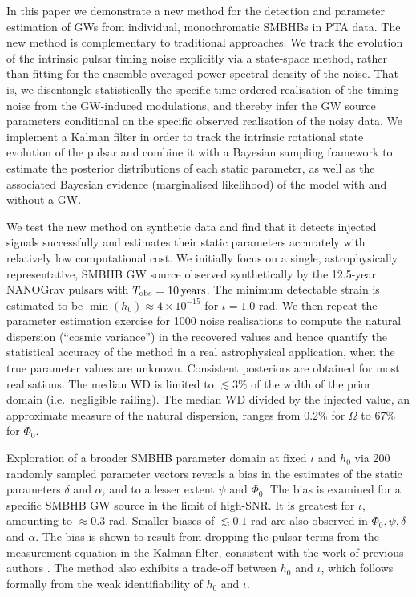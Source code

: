 \documentclass[fleqn,usenatbib,useAMS]{mnras}
\begin{document}
In this paper we demonstrate a new method for the detection and parameter estimation of GWs from individual, monochromatic SMBHBs in PTA data. The new method is complementary to traditional approaches. We track the evolution of the intrinsic pulsar timing noise explicitly via a state-space method, rather than fitting for the ensemble-averaged power spectral density of the noise. That is, we disentangle statistically the specific time-ordered realisation of the timing noise from the GW-induced modulations, and thereby infer the GW source parameters conditional on the specific observed realisation of the noisy data. We implement a Kalman filter in order to track the intrinsic rotational state evolution of the pulsar and combine it with a Bayesian sampling framework to estimate the posterior distributions of each static parameter, as well as the associated Bayesian evidence (marginalised likelihood) of the model with and without a GW. \newline 
 
 We test the new method on synthetic data and find that it detects injected signals successfully and estimates their static parameters accurately with relatively low computational cost. We initially focus on a single, astrophysically representative, SMBHB GW source observed synthetically by the 12.5-year NANOGrav pulsars with $T_{\rm obs} = 10 \, {\rm years}$. The minimum detectable strain is estimated to be $\min(h_0) \approx 4 \times 10^{-15}$ for $\iota=1.0$ rad. We then repeat the parameter estimation exercise for 1000 noise realisations to compute the natural dispersion (``cosmic variance'') in the recovered values and hence quantify the statistical accuracy of the method in a real astrophysical application, when the true parameter values are unknown. Consistent posteriors are obtained for most realisations. The median WD is limited to $\lesssim 3\%$ of the width of the prior domain (i.e.\ negligible railing). The median WD divided by the injected value, an approximate measure of the natural dispersion, ranges from  0.2\% for $\Omega$ to 67\% for $\Phi_0$. \newline 
  
  
Exploration of a broader SMBHB parameter domain at fixed $\iota$ and $h_0$ via 200 randomly sampled parameter vectors reveals a bias in the estimates of the static parameters $\delta$ and $\alpha$, and to a lesser extent $\psi$ and $\Phi_0$. The bias is examined for a specific SMBHB GW source in the limit of high-SNR. It is greatest for $\iota$, amounting to $\approx 0.3$ rad.  Smaller biases of $\lesssim 0.1$ rad are also observed in $\Phi_0, \psi, \delta$ and $\alpha$. The bias is shown to result from dropping the pulsar terms from the measurement equation in the Kalman filter, consistent with the work of previous authors \citep{Zhupulsarterms,Chen2022}. The method also exhibits a trade-off between $h_0$ and $\iota$, which follows formally from the weak identifiability of $h_0$ and $\iota$. \newline 
 
\end{document}
